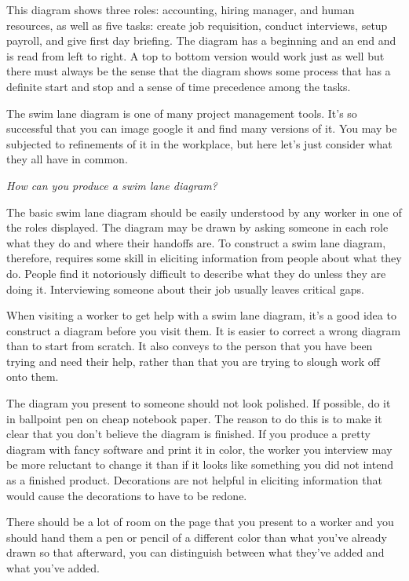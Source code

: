 This diagram shows three roles: accounting, hiring manager, and human
resources, as well as five tasks: create job requisition, conduct
interviews, setup payroll, and give first day briefing. The diagram has
a beginning and an end and is read from left to right. A top to bottom
version would work just as well but there must always be the sense that
the diagram shows some process that has a definite start and stop and a
sense of time precedence among the tasks.

The swim lane diagram is one of many project management tools. It's so
successful that you can image google it and find many versions of it.
You may be subjected to refinements of it in the workplace, but here
let's just consider what they all have in common.

\textit{How can you produce a swim lane diagram?}

The basic swim lane diagram should be easily understood by any worker in
one of the roles displayed. The diagram may be drawn by asking someone
in each role what they do and where their handoffs are. To construct a
swim lane diagram, therefore, requires some skill in eliciting
information from people about what they do. People find it notoriously
difficult to describe what they do unless they are doing it.
Interviewing someone about their job usually leaves critical gaps.

When visiting a worker to get help with a swim lane diagram, it's a good
idea to construct a diagram before you visit them. It is easier to
correct a wrong diagram than to start from scratch. It also conveys to
the person that you have been trying and need their help, rather than
that you are trying to slough work off onto them.

The diagram you present to someone should not look polished. If
possible, do it in ballpoint pen on cheap notebook paper. The reason to
do this is to make it clear that you don't believe the diagram is
finished. If you produce a pretty diagram with fancy software and print
it in color, the worker you interview may be more reluctant to change it
than if it looks like something you did not intend as a finished
product. Decorations are not helpful in eliciting information that would
cause the decorations to have to be redone.

There should be a lot of room on the page that you present to a worker
and you should hand them a pen or pencil of a different color than what
you've already drawn so that afterward, you can distinguish between what
they've added and what you've added.

